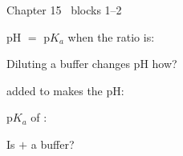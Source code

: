 \documentclass{apchem-worksheet}
\begin{document}
\begin{spiralstrip}{Chapter 15 \textbullet\ blocks 1--2}
  \item pH $=$ p$K_a$ when the ratio is:
  \item Diluting a buffer changes pH how? 
  \item {} added to  makes the pH:
  \item p$K_a$ of : 
  \item Is  $+$  a buffer? 
\end{spiralstrip}
\end{document}
